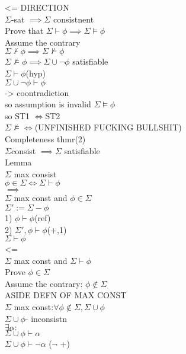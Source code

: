 \documentclass[12pt,oneside,fleqn]{article}
\theoremstyle{definition}
\begin{document}
<= DIRECTION \\
$\Sigma$-sat $\implies \Sigma$ consistnent \\
Prove that $\Sigma \vdash \phi \implies \Sigma \vDash \phi$ \\
Assume the contrary \\
$\Sigma \not \vdash \phi \implies \Sigma \not \vDash \phi$ \\
$\Sigma \not \vDash \phi \implies \Sigma \cup { \neg \phi }$ satisfiable \\
$\Sigma \vdash \phi $(hyp) \\
$\Sigma \cup { \neg \phi } \vdash \phi $ \\
-> coontradiction \\
so assumption is invalid $\Sigma \vDash \phi$ \\
so ST1 $\iff $ST2 \\
$\Sigma \not \vDash \iff $(UNFINISHED FUCKING BULLSHIT) \\

Completeness thmr(2) \\
$\Sigma $consist $\implies \Sigma$ satisfiable \\

Lemma \\
$\Sigma$ max consist \\
$\phi \in \Sigma \iff \Sigma \vdash \phi$ \\
$\implies $ \\
$\Sigma$ max const and $\phi \in \Sigma$ \\
$\Sigma' := \Sigma - { \phi} $ \\
1) $\phi \vdash \phi $(ref) \\
2) $\Sigma', \phi \vdash \phi $(+,1) \\
$\Sigma \vdash \phi$ \\

<= \\
$\Sigma$ max const and $\Sigma \vdash \phi$ \\
Prove $\phi \in \Sigma $ \\
Assume the contrary: $\phi \not \in \Sigma$ \\

ASIDE DEFN OF MAX CONST \\
$\Sigma$ max const:$ \forall \phi \not \in \Sigma, \Sigma \cup {\phi} $ \\
$\Sigma \cup {\phi} $- inconsistn \\
$\exists \alpha:$ \\
$\Sigma \cup { \phi} \vdash \alpha$ \\
$\Sigma \cup { \phi} \vdash \neg \alpha$ ($\neg$ +) \\
 
\end{document}
